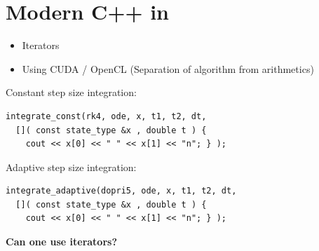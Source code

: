 \section{Modern C++ in \odeint}

\begin{frame}


\vspace{4ex}

\begin{itemize}
\item Iterators
\end{itemize}
\begin{itemize}
\item Using CUDA / OpenCL (Separation of algorithm from arithmetics)
\end{itemize}


\end{frame}






\begin{frame}[fragile]


\vspace{3ex}
Constant step size integration:
\begin{lstlisting}
integrate_const(rk4, ode, x, t1, t2, dt,
  []( const state_type &x , double t ) {
    cout << x[0] << " " << x[1] << "n"; } );
\end{lstlisting}

\vspace{1ex}
Adaptive step size integration:
\begin{lstlisting}
integrate_adaptive(dopri5, ode, x, t1, t2, dt,
  []( const state_type &x , double t ) {
    cout << x[0] << " " << x[1] << "n"; } );
\end{lstlisting}

\vspace{2ex}
\centerline{\bf Can one use iterators?}

\end{frame}




